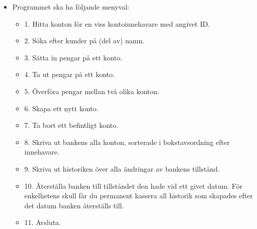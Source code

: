 \begin{itemize}
\item Programmet ska ha följande menyval:

\begin{itemize}
\item 1. Hitta konton för en viss kontoinnehavare med angivet ID.
\item 2. Söka efter kunder på (del av) namn.
\item 3. Sätta in pengar på ett konto.
\item 4. Ta ut pengar på ett konto.
\item 5. Överföra pengar mellan två olika konton.
\item 6. Skapa ett nytt konto.
\item 7. Ta bort ett befintligt konto.
\item 8. Skriva ut bankens alla konton, sorterade i bokstavsordning efter innehavare.
\item 9. Skriva ut historiken över alla ändringar av bankens tillstånd.
\item 10. Återställa banken till tillståndet den hade vid ett givet datum. För enkelhetens skull får du permanent kassera all historik som skapades efter det datum banken återställs till.
\item 11. Avsluta.
\end{itemize}


\end{itemize}
